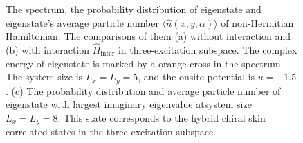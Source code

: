 \documentclass[longbibliography, aps, prx, amsmath, amssymb, amsfonts, twocolumn,superscriptaddress, footinbib]{revtex4-1}
\begin{document}
\begin{figure}[htbp]
		\caption{%
		The spectrum, the probability distribution of eigenstate and eigenstate's average particle number $\langle \hat{n}(x,y,\alpha) \rangle$ of non-Hermitian Hamiltonian. The comparisons of them (a) without interaction and (b) with interaction $\hat{H}_{\text{inter}}$ in three-excitation subspace. 
		The complex energy of eigenstate is marked by a orange cross in the spectrum. The system size is $L_x = L_y = 5$, and the onsite potential is $u = -1.5$.
		(c) The probability distribution and average particle number of eigenstate with largest imaginary eigenvalue atsystem size $L_x=L_y=8$. This state corresponds to the hybrid chiral skin correlated states in the three-excitation subspace.
		}
		\label{fig:03}
	\end{figure}
\end{document}
